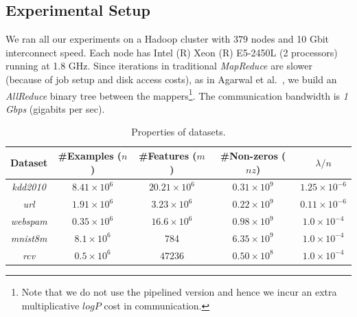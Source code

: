 \documentclass[twoside, 11pt]{article}
\begin{document}
\subsection{Experimental Setup}
\label{subsec:setup}

We ran all our experiments on a Hadoop cluster with $379$ nodes and 10 Gbit interconnect speed. Each node has Intel (R) Xeon (R) E5-2450L (2 processors) running at 1.8 GHz.
Since iterations in traditional {\it MapReduce} are slower (because of job setup and disk access costs), as in Agarwal et al.~\citep{agarwal2011}, we build an {\it AllReduce} binary tree between the mappers\footnote{Note that we do not use the pipelined version and hence we incur an extra multiplicative $logP$ cost in communication.}. The communication bandwidth is {\em 1 Gbps} (gigabits per sec).

\begin{table}[ht]
\centering %
\begin{tabular}{c c c c c} %
\hline\hline %
Dataset & \#Examples ($n$) & \#Features ($m$) & \#Non-zeros ($nz$) & $\lambda/n$ \\ %
\hline
{\it{kdd2010}} & $8.41\times 10^6$ & $20.21\times 10^6$ & $0.31\times 10^9$ & $1.25\times 10^{-6}$ \\
{\it{url }} & $1.91\times 10^6$ &  $3.23\times 10^6$ &  $0.22\times 10^9$ & $0.11\times10^{-6}$ \\
{\it{webspam}} & $0.35\times 10^6$ & $16.6\times 10^6$ & $0.98\times 10^9$  & $1.0\times10^{-4}$ \\
{\it{mnist8m}} & $8.1\times 10^6$ & 784 & $6.35\times 10^9$ & $1.0\times10^{-4}$ \\
{\it{rcv}} & $0.5\times 10^6$ & $47236$ & $0.50\times 10^8$ & $1.0\times10^{-4}$ \\
\hline
\end{tabular}
\caption{Properties of datasets.} %
\label{tab:params}
\end{table}
\end{document}
